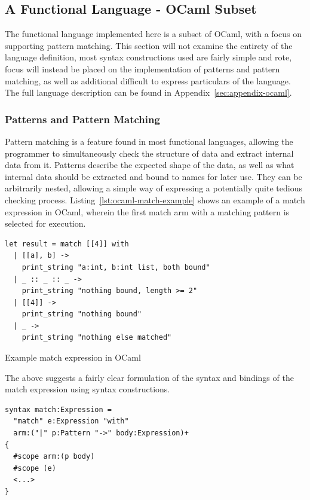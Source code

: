 \documentclass{kththesis}
\begin{document}
\subsection{A Functional Language - OCaml Subset} \label{sec:functional-eval}

The functional language implemented here is a subset of OCaml, with a focus on supporting pattern matching. This section will not examine the entirety of the language definition, most syntax constructions used are fairly simple and rote, focus will instead be placed on the implementation of patterns and pattern matching, as well as additional difficult to express particulars of the language. The full language description can be found in Appendix~\ref{sec:appendix-ocaml}.

\subsubsection{Patterns and Pattern Matching} \label{sec:functional-pattern-matching}

Pattern matching is a feature found in most functional languages, allowing the programmer to simultaneously check the structure of data and extract internal data from it. Patterns describe the expected shape of the data, as well as what internal data should be extracted and bound to names for later use. They can be arbitrarily nested, allowing a simple way of expressing a potentially quite tedious checking process. Listing~\ref{lst:ocaml-match-example} shows an example of a match expression in OCaml, wherein the first match arm with a matching pattern is selected for execution.

\begin{listing}[ht]
\begin{verbatim}
let result = match [[4]] with
  | [[a], b] ->
    print_string "a:int, b:int list, both bound"
  | _ :: _ :: _ ->
    print_string "nothing bound, length >= 2"
  | [[4]] ->
    print_string "nothing bound"
  | _ ->
    print_string "nothing else matched"
\end{verbatim}
\caption{Example match expression in OCaml}
\label{lst:ocaml-match-example}
\end{listing}

The above suggests a fairly clear formulation of the syntax and bindings of the match expression using syntax constructions.

\begin{verbatim}
syntax match:Expression =
  "match" e:Expression "with"
  arm:("|" p:Pattern "->" body:Expression)+
{
  #scope arm:(p body)
  #scope (e)
  <...>
}
\end{verbatim}
\end{document}
